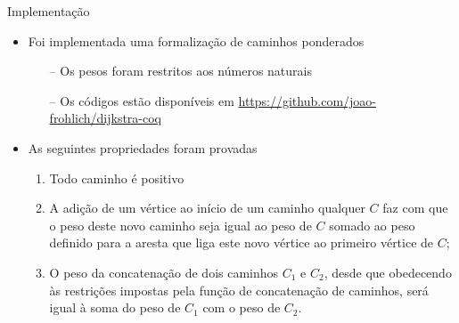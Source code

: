 \begin{frame}{Implementação}
    \begin{itemize}
        \item Foi implementada uma formalização de caminhos ponderados
        \begin{itemize}
            \item [--] Os pesos foram restritos aos números naturais
            \item [--] Os códigos estão disponíveis em \url{https://github.com/joao-frohlich/dijkstra-coq}
        \end{itemize}
        \item As seguintes propriedades foram provadas
        \begin{enumerate}
            \item Todo caminho é positivo
            \item A adição de um vértice ao início de um caminho qualquer $C$ faz com que o peso deste novo caminho seja igual ao peso de
            $C$ somado ao peso definido para a aresta que liga este novo vértice ao primeiro vértice de $C$;
            \item O peso da concatenação de dois caminhos $C_1$ e $C_2$, desde que obedecendo às restrições impostas pela função de
            concatenação de caminhos, será igual à soma do peso de $C_1$ com o peso de $C_2$.
        \end{enumerate}
    \end{itemize}
\end{frame}